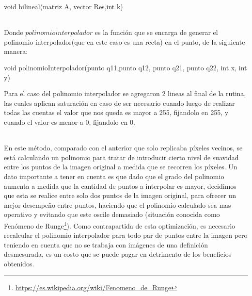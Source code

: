 \begin{algorithm}
\begin{algorithmic}[H]\parskip=1mm
\caption{void bilineal(matriz A, vector Res,int k)}
\end{algorithmic}
\end{algorithm}\\
Donde $polinomio interpolador$ es la función que se encarga de generar el polinomio interpolador(que en este caso es una recta) en el punto, de la siguiente manera:
\begin{algorithm}
\begin{algorithmic}[H]\parskip=1mm
\caption{void polinomioInterpolador(punto q11,punto q12, punto q21, punto q22, int x, int y)}
\end{algorithmic}
\end{algorithm}
Para el caso del polinomio interpolador se agregaron 2 lineas al final de la rutina, las cuales aplican saturación en caso de ser necesario cuando luego de realizar todas las cuentas el valor que nos queda es mayor a 255, fijandolo en 255, y cuando el valor es menor a 0, fijandolo en 0.

\\
En este método, comparado con el anterior que solo replicaba píxeles vecinos, se está calculando un polinomio para tratar de introducir cierto nivel de suavidad entre los puntos de la imagen original a medida que se recorren los píxeles. Un dato importante a tener en cuenta es que dado que el grado del polinomio aumenta a medida que la cantidad de puntos a interpolar es mayor, decidimos que esta se realice entre solo dos puntos de la imagen original, para ofrecer un mejor desempe\~no entre puntos, haciendo que el polinomio calculado sea mas operativo y evitando que este oscile demasiado (situación conocida como Fenómeno de Runge\footnote{\url{https://es.wikipedia.org/wiki/Fenomeno_de_Runge}}). Como contrapartida de esta optimización, es necesario recalcular el polinomio interpolador para todo par de puntos entre la imagen pero teniendo en cuenta que no se trabaja con imágenes de una definición desmesurada, es un costo que se puede pagar en detrimento de los beneficios obtenidos.


